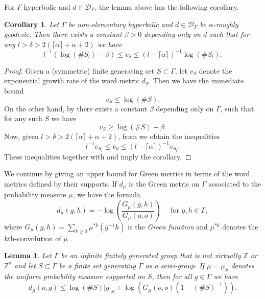 \documentclass[twoside]{amsart}
\newtheorem{corollary}[theorem]{Corollary}
\newtheorem{lemma}[theorem]{Lemma}
\theoremstyle{definition}
\numberwithin{equation}{section}
\numberwithin{theorem}{section}
\newcommand{\Z}{\mathbb{Z}}
\newcommand{\calD}{\mathcal{D}}
\newcommand{\al}{\alpha}
\newcommand{\G}{\Gamma}
\newcommand{\del}{\delta}
\newcommand{\m}{\mu}
\begin{document}
For $\G$ hyperbolic and $d\in \calD_\G$, the lemma above has the following corollary.

\begin{corollary}\label{coro.convEGR}
    Let $\G$ be non-elementary hyperbolic and $d\in \calD_\G$ be $\al$-roughly geodesic. Then there exists a constant $\beta>0$ depending only on $d$ such that for any $l>\del >2(\lceil \al \rceil+\al+2)$ we have
    \[l^{-1}(\log(\# S_l)-\beta)\leq v_d\leq (l-\lceil \al\rceil)^{-1}\log(\# S_l).\]
\end{corollary}

\begin{proof}
  Given a (symmetric) finite generating set $S\subset \G$, let $v_S$ denote the exponential growth rate of the word metric $d_S$. Then we have the immediate bound \begin{equation}\label{eq.1boundeasy}
      v_S\leq \log(\# S). 
  \end{equation}
  On the other hand, by \cite[Theorem~1]{arzhantseva-lysenok} there exists a constant $\beta$ depending only on $\G$, such that for any such $S$ we have \begin{equation}\label{eq.AL}
      v_S \geq \log(\# S)-\beta.
  \end{equation} 
  Now, given $l>\del >2(\lceil \al \rceil+\al+2)$, 
  from  we obtain the inequalities
\[l^{-1}v_{S_l}\leq v_d\leq (l-\lceil \al\rceil)^{-1}v_{S_l}.\]
These inequalities together with  and  imply the corollary.
\end{proof}


We continue by giving an upper bound for Green metrics in terms of the word metrics defined by their supports. If $d_\mu$ is the Green metric on $\G$ associated to the probability measure $\mu$, we have the formula
\[d_\mu(g,h)=-\log\left(\frac{G_\mu(g,h)}{G_\mu(o,o)}\right) \quad \text{ for }g,h\in \G,\]
where $G_\mu(g,h)=\sum_{k\geq 0}{\mu^{\ast k}(g^{-1}h)}$ is the \emph{Green function} and $\mu^{\ast k}$ denotes the $k$th-convolution of $\mu$ \cite[p.~686]{BHM.harmonic}.

\begin{lemma}\label{lem.greeneasyineq}
Let $\G$ be an infinite finitely generated group that is not virtually $\Z$ or $\Z^2$ and let $S\subset \G$ be a finite set generating $\G$ as a semi-group. If $\m=\m_S$ denotes the uniform probability measure supported on $S$, then for all $g\in \G$ we have
\begin{equation*}
    d_\mu(o,g)\leq \log\left(\#S\right)|g|_S+\log\left(G_\m(o,o)(1-(\#S)^{-1})\right).
\end{equation*}
\end{lemma}
\end{document}
